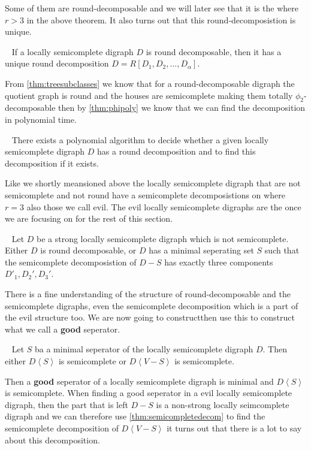 Some of them are round-decomposable and we will later see that it is the where $r>3$ in the above theorem. 
It also turns out that this round-decomposistion is unique.
\begin{cor}~\cite{bangDM167}
    If a locally semicomplete digraph $D$ is round decomposable, then it has a unique round decomposition $D=R[D_1,D_2,\dots ,D_{\alpha}]$.
\end{cor}
From \autoref{thm:treesubclasses} we know that for a round-decomposable digraph the quotient graph is round and the houses are semicomplete making them totally $\phi_2$-decomposable then by \autoref{thm:phipoly} we know that we can find the decomposition in polynomial time.
\begin{prop}~\cite{bangDM167}
    There exists a polynomial algorithm to decide whether a given locally semicomplete digraph $D$ has a round decomposition and to find this decomposition if it exists.
\end{prop}
Like we shortly meansioned above the locally semicomplete digraph that are not semicomplete and not round have a semicomplete decomposistions on where $r=3$ also those we call evil.
The evil locally semicomplete digraphs are the once we are focusing on for the rest of this section.
\begin{lemma}~\cite{bangDM167}
    Let $D$ be a strong locally semicomplete digraph which is not semicomplete. Either $D$ is round decomposable, or $D$ has a minimal seperating set $S$ such that the semicomplete decomposistion of $D-S$ has exactly three components $D'_1,D_2',D_3'$.
\end{lemma}
There is a fine understanding of the structure of round-decomposable and the semicomplete digraphs, even the semicomplete decomposition which is a part of the evil structure too.
We are now going to constructthen use this to construct what we call a \textbf{good} seperator.
\begin{lemma}~\cite{bangJGT85}
    Let $S$ ba a minimal seperator of the locally semicomplete digraph $D$. Then either $D\left< S\right>$ is semicomplete or $D\left< V-S\right>$ is semicomplete.
    \label{lem:whichsemicomplete}
\end{lemma}
Then a \textbf{good} seperator of a locally semicomplete digraph is minimal and $D\left<S\right>$ is semicomplete.
When finding a good seperator in a evil locally semicomplete digraph, then the part that is left $D-S$ is a non-strong locally seimcomplete digraph and we can therefore use \autoref{thm:semicompletedecom} to find the semicomplete decomposition of $D\left<V-S\right>$ it turns out that there is a lot to say about this decomposition. 
